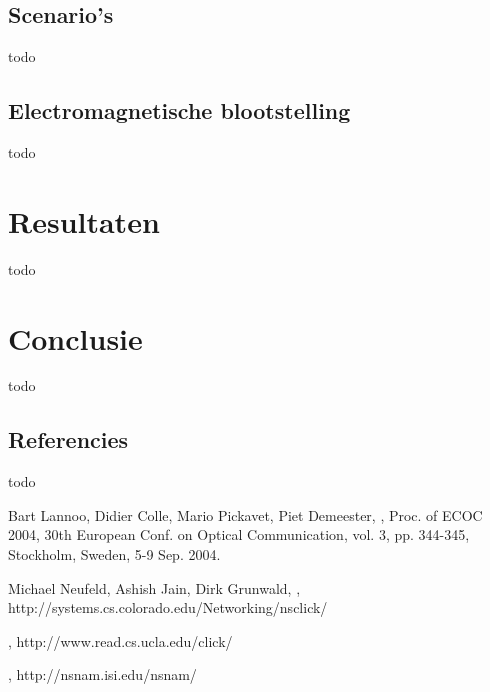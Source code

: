 \documentclass[twocolumn]{phdsymp} %
\begin{document}
\subsection{Scenario's}
todo 

\subsection{Electromagnetische blootstelling}
todo

\section{Resultaten}
todo

\section{Conclusie}
todo

\subsection{Referencies}
todo


\nocite{*}



%
\begin{thebibliography}{1}
Bart Lannoo, Didier Colle, Mario Pickavet, Piet Demeester,
,
\newblock Proc. of ECOC 2004, 30th European Conf. on Optical Communication, vol. 3, pp. 344-345, Stockholm, Sweden, 5-9 Sep. 2004.

Michael Neufeld, Ashish Jain, Dirk Grunwald,
,
\newblock http://systems.cs.colorado.edu/Networking/nsclick/

,
\newblock http://www.read.cs.ucla.edu/click/

,
\newblock http://nsnam.isi.edu/nsnam/

\end{thebibliography}
%
\end{document}
